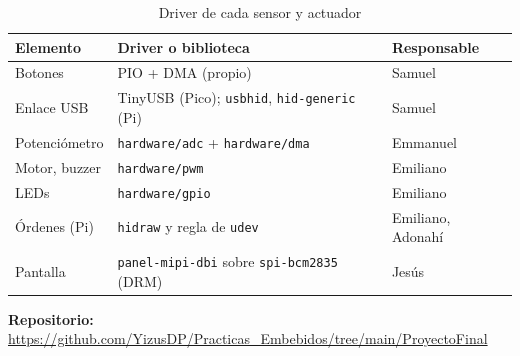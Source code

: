 \documentclass[conference]{IEEEtran}
\begin{document}
\begin{table}[H]
	\centering
	\caption{Driver de cada sensor y actuador}
	\label{tab:drivers}
	\footnotesize
	\begin{tabular}{|p{1.7cm}|p{2.9cm}|p{2.3cm}|}
		\hline
		\textbf{Elemento} & \textbf{Driver o biblioteca} & \textbf{Responsable} \\
		\hline
		Botones & PIO + DMA (propio) & Samuel \\
		\hline
		Enlace USB & TinyUSB (Pico); \texttt{usbhid}, \texttt{hid-generic} (Pi) & Samuel \\
		\hline
		Potenciómetro & \texttt{hardware/adc} + \texttt{hardware/dma} & Emmanuel \\
		\hline
		Motor, buzzer & \texttt{hardware/pwm} & Emiliano \\
		\hline
		LEDs & \texttt{hardware/gpio} & Emiliano \\
		\hline
		Órdenes (Pi) & \texttt{hidraw} y regla de \texttt{udev} & Emiliano, Adonahí \\
		\hline
		Pantalla & \texttt{panel-mipi-dbi} sobre \texttt{spi-bcm2835} (DRM) & Jesús \\
		\hline
	\end{tabular}
\end{table}


\vspace{0.2cm}
\noindent\textbf{Repositorio:} \\
\url{https://github.com/YizusDP/Practicas_Embebidos/tree/main/ProyectoFinal}
\end{document}

